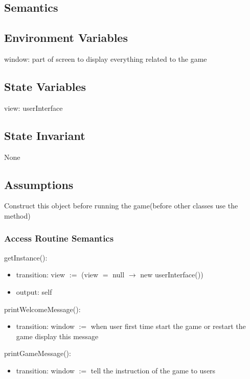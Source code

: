 \documentclass[12pt]{article}
\begin{document}
\subsection* {Semantics}

\subsection*{Environment Variables}

window: part of screen to display everything related to the game

\subsection*{State Variables}


view: userInterface \\

\subsection*{State Invariant}

None

\subsection*{Assumptions}

Construct this object before running the game(before other classes use the method)

\subsubsection* {Access Routine Semantics}

getInstance():
\begin{itemize}
  \item transition: view $:=$ (view $=$ null $\rightarrow$ new userInterface())
  \item output: self
\end{itemize}

\noindent printWelcomeMessage():
\begin{itemize}
  \item transition: window $:=$ when user first time start the game or restart the game display this message
\end{itemize}

\noindent printGameMessage():
\begin{itemize}
  \item transition: window $:=$ tell the instruction of the game to users
\end{itemize}
\end{document}
